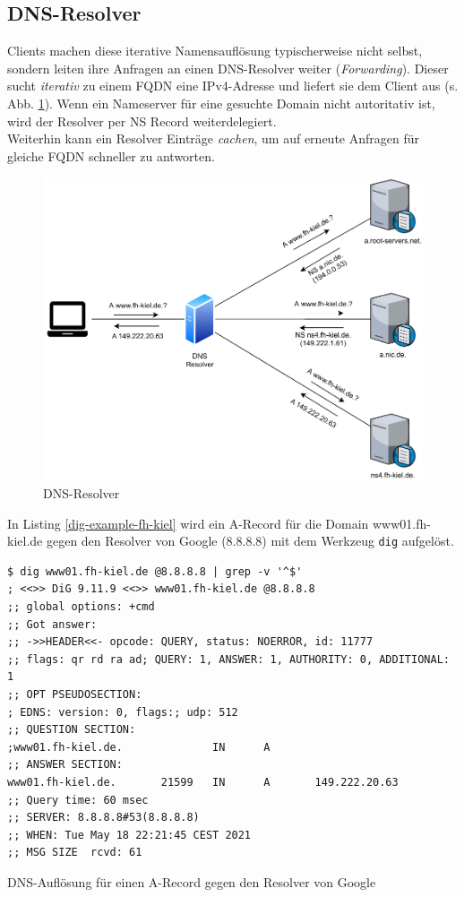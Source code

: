 \subsection{DNS-Resolver}
\gls{Client}s machen diese iterative Namensauflösung typischerweise nicht selbst, sondern leiten ihre Anfragen an einen \gls{DNS}-Resolver weiter (\textit{Forwarding}). Dieser sucht \textit{iterativ} zu einem \gls{FQDN} eine IPv4-Adresse und liefert sie dem \gls{Client} aus (s. Abb. \ref{grafik: dns-resolver}). Wenn ein Nameserver für eine gesuchte Domain nicht autoritativ ist, wird der Resolver per NS Record weiterdelegiert.\\
Weiterhin kann ein Resolver Einträge \textit{cachen}, um auf erneute Anfragen für gleiche \gls{FQDN} schneller zu antworten.
\begin{figure}[h]
  \centering
  \includegraphics[scale=0.7]{Figures/dns_recursion.pdf}
  \caption{DNS-Resolver}
  \label{grafik: dns-resolver}
\end{figure}\FloatBarrier
In Listing \ref{dig-example-fh-kiel} wird ein A-Record für die Domain www01.fh-kiel.de gegen den Resolver von Google (8.8.8.8) mit dem Werkzeug \texttt{dig} aufgelöst.
\begin{listing}[h]
\begin{verbatim}
$ dig www01.fh-kiel.de @8.8.8.8 | grep -v '^$'
; <<>> DiG 9.11.9 <<>> www01.fh-kiel.de @8.8.8.8
;; global options: +cmd
;; Got answer:
;; ->>HEADER<<- opcode: QUERY, status: NOERROR, id: 11777
;; flags: qr rd ra ad; QUERY: 1, ANSWER: 1, AUTHORITY: 0, ADDITIONAL: 1
;; OPT PSEUDOSECTION:
; EDNS: version: 0, flags:; udp: 512
;; QUESTION SECTION:
;www01.fh-kiel.de.              IN      A
;; ANSWER SECTION:
www01.fh-kiel.de.       21599   IN      A       149.222.20.63
;; Query time: 60 msec
;; SERVER: 8.8.8.8#53(8.8.8.8)
;; WHEN: Tue May 18 22:21:45 CEST 2021
;; MSG SIZE  rcvd: 61
\end{verbatim}
\caption{DNS-Auflösung für einen A-Record gegen den Resolver von Google}
\label{dig-example-fh-kiel}
\end{listing}\FloatBarrier

